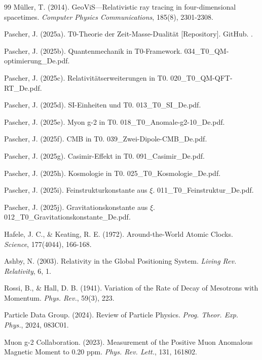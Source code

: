 \begin{thebibliography}{99}
		Müller, T. (2014). GeoViS—Relativistic ray tracing in four-dimensional spacetimes. \emph{Computer Physics Communications}, 185(8), 2301-2308.
		
		Pascher, J. (2025a). T0-Theorie der Zeit-Masse-Dualität [Repository]. GitHub. .
		
		Pascher, J. (2025b). Quantenmechanik in T0-Framework. 034\_T0\_QM-optimierung\_De.pdf.
		
		Pascher, J. (2025c). Relativitätserweiterungen in T0. 020\_T0\_QM-QFT-RT\_De.pdf.
		
		Pascher, J. (2025d). SI-Einheiten und T0. 013\_T0\_SI\_De.pdf.
		
		Pascher, J. (2025e). Myon g-2 in T0. 018\_T0\_Anomale-g2-10\_De.pdf.
		
		Pascher, J. (2025f). CMB in T0. 039\_Zwei-Dipole-CMB\_De.pdf.
		
		Pascher, J. (2025g). Casimir-Effekt in T0. 091\_Casimir\_De.pdf.
		
		Pascher, J. (2025h). Kosmologie in T0. 025\_T0\_Kosmologie\_De.pdf.
		
		Pascher, J. (2025i). Feinstrukturkonstante aus $\xi$. 011\_T0\_Feinstruktur\_De.pdf.
		
		Pascher, J. (2025j). Gravitationskonstante aus $\xi$. 012\_T0\_Gravitationskonstante\_De.pdf.
		
		Hafele, J. C., \& Keating, R. E. (1972). Around-the-World Atomic Clocks. \emph{Science}, 177(4044), 166-168.
		
		Ashby, N. (2003). Relativity in the Global Positioning System. \emph{Living Rev. Relativity}, 6, 1.
		
		Rossi, B., \& Hall, D. B. (1941). Variation of the Rate of Decay of Mesotrons with Momentum. \emph{Phys. Rev.}, 59(3), 223.
		
		Particle Data Group. (2024). Review of Particle Physics. \emph{Prog. Theor. Exp. Phys.}, 2024, 083C01.
		
		Muon g-2 Collaboration. (2023). Measurement of the Positive Muon Anomalous Magnetic Moment to 0.20 ppm. \emph{Phys. Rev. Lett.}, 131, 161802.
		

\end{thebibliography}
